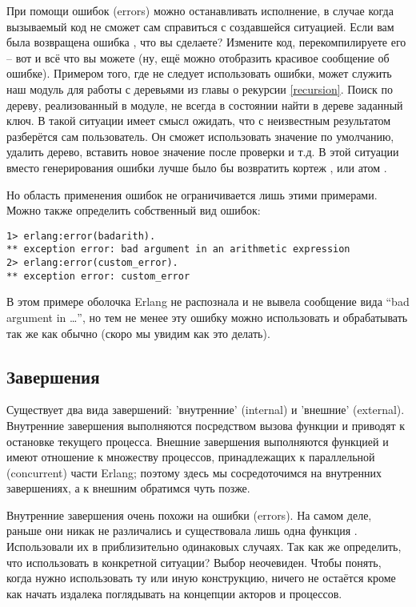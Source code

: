При помощи ошибок (errors) можно останавливать исполнение, в случае когда вызываемый код не сможет сам справиться с создавшейся ситуацией.
Если вам была возвращена ошибка , что вы сделаете?
Измените код, перекомпилируете его \--- вот и всё что вы можете (ну, ещё можно отобразить красивое сообщение об ошибке).
Примером того, где не следует использовать ошибки, может служить наш модуль для работы с деревьями из главы о рекурсии \ref{recursion}.
Поиск по дереву, реализованный в модуле, не всегда в состоянии найти в дереве заданный ключ.
В такой ситуации имеет смысл ожидать, что с неизвестным результатом разберётся сам пользователь. 
Он сможет использовать значение по умолчанию, удалить дерево, вставить новое значение после проверки и т.д.
В этой ситуации вместо генерирования ошибки лучше было бы возвратить кортеж , или атом .

Но область применения ошибок не ограничивается лишь этими примерами.
Можно также определить собственный вид ошибок:
\begin{lstlisting}[style=erlang]
1> erlang:error(badarith).
** exception error: bad argument in an arithmetic expression
2> erlang:error(custom_error).
** exception error: custom_error
\end{lstlisting}

В этом примере оболочка Erlang не распознала  и не вывела сообщение вида ``bad argument in \ldots'', но тем не менее эту ошибку можно использовать и обрабатывать так же как обычно (скоро мы увидим как это делать).

\subsection{Завершения}
\label{exits}
Существует два вида завершений: 'внутренние' (internal) и 'внешние' (external).
Внутренние завершения выполняются посредством вызова функции  и приводят к остановке текущего процесса.
Внешние завершения выполняются функцией  и имеют отношение к множеству процессов, принадлежащих к параллельной (concurrent) части Erlang; поэтому здесь мы сосредоточимся на внутренних завершениях, а к внешним обратимся чуть позже.

Внутренние завершения очень похожи на ошибки (errors).
На самом деле, раньше они никак не различались и существовала лишь одна функция .
Использовали их в приблизительно одинаковых случаях.
Так как же определить, что использовать в конкретной ситуации?
Выбор неочевиден.
Чтобы понять, когда нужно использовать ту или иную конструкцию, ничего не остаётся кроме как начать издалека поглядывать на концепции акторов и процессов.


